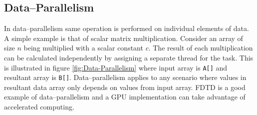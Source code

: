 \subsection{Data--Parallelism}
In data--parallelism same operation is performed on individual elements of data. A simple example is that of scalar matrix multiplication. Consider an array of size $n$ being multiplied with a scalar constant $c$. The result of each multiplication can be calculated independently by assigning a separate thread for the task. This is illustrated in figure \ref{fig:Data-Parallelism} where input array is \texttt{A[]} and resultant array is \texttt{B[]}. Data--parallelism applies to any scenario where values in resultant data array only depends on values from input array. FDTD is a good example of data--parallelism and a GPU implementation can take advantage of accelerated computing.
